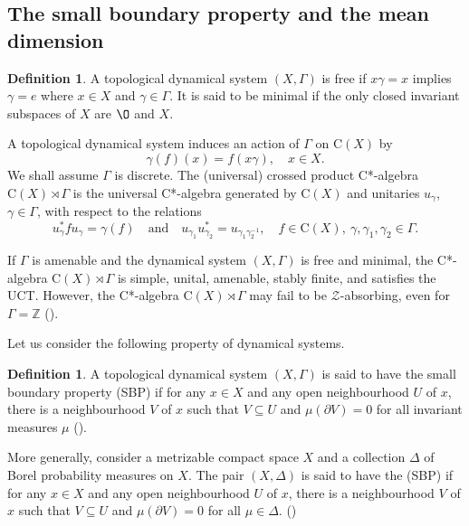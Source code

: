 \documentclass[12pt, oneside, psamsfonts]{amsart}
\theoremstyle{definition}
\newtheorem{defn}[thm]{Definition}
\theoremstyle{remark}
\numberwithin{equation}{section}
\newcommand{\Int}{\mathbb Z}
\begin{document}
\subsection{The small boundary property and the mean dimension}

\begin{defn}
A topological dynamical system $(X, \Gamma)$ is free if $x \gamma = x$ implies $\gamma = e$ where $x\in X$ and $\gamma \in \Gamma$. It is said to be minimal if the only closed invariant subspaces of $X$ are $\O$ and $X$. 

A topological dynamical system induces an action of $\Gamma$ on $\mathrm{C}(X)$ by $$\gamma(f)(x) = f(x\gamma),\quad x \in X.$$ We shall assume $\Gamma$ is discrete. The (universal) crossed product C*-algebra $\mathrm{C}(X) \rtimes \Gamma$ is the universal C*-algebra generated by $\mathrm{C}(X)$ and unitaries $u_\gamma$, $\gamma \in \Gamma$, with respect to the relations
$$ u^*_{\gamma} f u_{\gamma} = \gamma(f) \quad \mathrm{and} \quad u_{\gamma_1} u^*_{\gamma_2} = u_{\gamma_1 \gamma^{-1}_2},\quad f\in \mathrm{C}(X),\ \gamma, \gamma_1, \gamma_2 \in \Gamma.$$
\end{defn}

If $\Gamma$ is amenable and the dynamical system $(X, \Gamma)$ is free and minimal, the C*-algebra $\mathrm{C}(X) \rtimes \Gamma$ is simple, unital, amenable, stably finite, and satisfies the UCT. However, the C*-algebra $\mathrm{C}(X) \rtimes \Gamma$ may fail to be $\mathcal Z$-absorbing, even for $\Gamma =\Int$ (\cite{GK-Dyn}).

Let us consider the following property of dynamical systems.
\begin{defn}
A topological dynamical system $(X, \Gamma)$ is said to have the small boundary property (SBP) if for any $x \in X$ and any open neighbourhood $U$ of $x$, there is a neighbourhood $V$ of $x$ such that $V \subseteq U$ and $\mu(\partial V) = 0$ for all invariant measures $\mu$ (\cite{Lindenstrauss-Weiss-MD}).

More generally, consider a metrizable compact space $X$ and a collection $\Delta$ of Borel probability measures on $X$. The pair $(X, \Delta)$ is said to have the (SBP) if for any $x \in X$ and any open neighbourhood $U$ of $x$, there is a neighbourhood $V$ of $x$ such that $V \subseteq U$ and $\mu(\partial V) = 0$ for all $\mu \in \Delta$.  (\cite{EN-SBP-I})
\end{defn}
\end{document}
